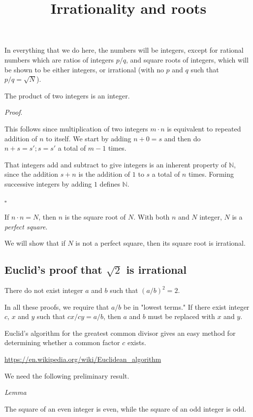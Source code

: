 \documentclass[11pt, oneside]{article}
\title{Irrationality and roots}
\date{}
\begin{document}
\maketitle
\Large


In everything that we do here, the numbers will be integers, except for rational numbers which are ratios of integers $p/q$, and square roots of integers, which will be shown to be either integers, or irrational (with no $p$ and $q$ such that $p/q = \sqrt{N}$).

The product of two integers is an integer.  

\emph{Proof}.

This follows since multiplication of two integers $m \cdot n$ is equivalent to repeated addition of $n$ to itself.  We start by adding $n + 0 = s$ and then do $n + s = s';  s = s'$ a total of $m-1$ times.

That integers add and subtract to give integers is an inherent property of $\mathbb{N}$, since the addition $s + n$ is the addition of $1$ to $s$ a total of $n$ times. Forming successive integers by adding $1$ defines $\mathbb{N}$.

$\square$

If $n \cdot n = N$, then $n$ is the square root of $N$.  With both $n$ and $N$ integer, $N$ is a \emph{perfect square}.  

We will show that if $N$ is not a perfect square, then its square root is irrational.  

\subsection*{Euclid's proof that $\sqrt{2}$ is irrational}

There do not exist integer $a$ and $b$ such that $(a/b)^2 = 2$.  

In all these proofs, we require that $a/b$ be in "lowest terms."  If there exist integer $c$, $x$ and $y$ such that $cx/cy = a/b$, then $a$ and $b$ must be replaced with $x$ and $y$.

Euclid's algorithm for the greatest common divisor gives an easy method for determining whether a common factor $c$ exists.

\url{https://en.wikipedia.org/wiki/Euclidean_algorithm}

We need the following preliminary result.

\emph{Lemma}

The square of an even integer is even, while the square of an odd integer is odd.
\end{document}
